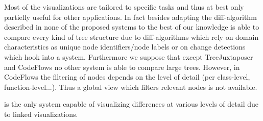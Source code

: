 Most of the visualizations are tailored to specific tasks and thus at best only partielly useful for other applications. In fact besides adapting the diff-algorithm described in \cite{telea2008code} none of the proposed systems to the best of our knowledge is able to compare every kind of tree structure due to diff-algorithms which rely on domain characteristics as unique node identifiers/node labels or on change detections which hook into a system. Furthermore we suppose that except TreeJuxtaposer and CodeFlows no other system is able to compare large trees. However, in CodeFlows the filtering of nodes depends on the level of detail (per class-level, function-level...). Thus a global view which filters relevant nodes is not available.

\cite{bremm2011interactive} is the only system capable of visualizing differences at various levels of detail due to linked visualizations.














